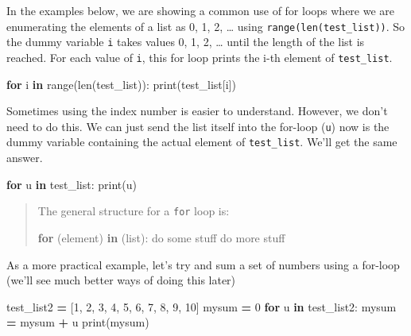 \documentclass[
  letterpaper,
]{scrbook}
\newenvironment{Shaded}{\begin{snugshade}}{\end{snugshade}}
\newcommand{\BuiltInTok}[1]{#1}
\newcommand{\ControlFlowTok}[1]{\textcolor[rgb]{0.13,0.29,0.53}{\textbf{#1}}}
\newcommand{\DecValTok}[1]{\textcolor[rgb]{0.00,0.00,0.81}{#1}}
\newcommand{\KeywordTok}[1]{\textcolor[rgb]{0.13,0.29,0.53}{\textbf{#1}}}
\newcommand{\NormalTok}[1]{#1}
\newcommand{\OperatorTok}[1]{\textcolor[rgb]{0.81,0.36,0.00}{\textbf{#1}}}
\begin{document}
In the examples below, we are showing a common use of for loops where we are enumerating the elements of a list as 0, 1, 2, \ldots{} using \texttt{range(len(test\_list))}. So the dummy variable \texttt{i} takes values 0, 1, 2, \ldots{} until the length of the list is reached. For each value of \texttt{i}, this for loop prints the i-th element of \texttt{test\_list}.

\begin{Shaded}
\begin{Highlighting}[]
\ControlFlowTok{for}\NormalTok{ i }\KeywordTok{in} \BuiltInTok{range}\NormalTok{(}\BuiltInTok{len}\NormalTok{(test\_list)):}
    \BuiltInTok{print}\NormalTok{(test\_list[i])}
\end{Highlighting}
\end{Shaded}

Sometimes using the index number is easier to understand. However, we don't need to do this. We can just send the list itself into the for-loop (\texttt{u}) now is the dummy variable containing the actual element of \texttt{test\_list}. We'll get the same answer.

\begin{Shaded}
\begin{Highlighting}[]
\ControlFlowTok{for}\NormalTok{ u }\KeywordTok{in}\NormalTok{ test\_list:}
    \BuiltInTok{print}\NormalTok{(u)}
\end{Highlighting}
\end{Shaded}

\begin{quote}
The general structure for a \texttt{for} loop is:

\begin{Shaded}
\begin{Highlighting}[]
\ControlFlowTok{for}\NormalTok{ (element) }\KeywordTok{in}\NormalTok{ (}\BuiltInTok{list}\NormalTok{):}
\NormalTok{      do some stuff}
\NormalTok{      do more stuff}
\end{Highlighting}
\end{Shaded}
\end{quote}

As a more practical example, let's try and sum a set of numbers using a for-loop (we'll see much better ways of doing this later)

\begin{Shaded}
\begin{Highlighting}[]
\NormalTok{test\_list2 }\OperatorTok{=}\NormalTok{ [}\DecValTok{1}\NormalTok{, }\DecValTok{2}\NormalTok{, }\DecValTok{3}\NormalTok{, }\DecValTok{4}\NormalTok{, }\DecValTok{5}\NormalTok{, }\DecValTok{6}\NormalTok{, }\DecValTok{7}\NormalTok{, }\DecValTok{8}\NormalTok{, }\DecValTok{9}\NormalTok{, }\DecValTok{10}\NormalTok{]}
\NormalTok{mysum }\OperatorTok{=} \DecValTok{0}
\ControlFlowTok{for}\NormalTok{ u }\KeywordTok{in}\NormalTok{ test\_list2:}
\NormalTok{    mysum }\OperatorTok{=}\NormalTok{ mysum }\OperatorTok{+}\NormalTok{ u}
\BuiltInTok{print}\NormalTok{(mysum)}
\end{Highlighting}
\end{Shaded}
\end{document}
